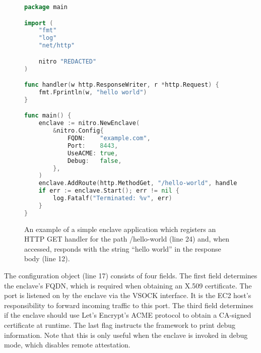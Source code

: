 \begin{figure}[t]
\begin{lstlisting}[language=go]
package main

import (
    "fmt"
    "log"
    "net/http"

    nitro "REDACTED"
)

func handler(w http.ResponseWriter, r *http.Request) {
    fmt.Fprintln(w, "hello world")
}

func main() {
    enclave := nitro.NewEnclave(
        &nitro.Config{
            FQDN:    "example.com",
            Port:    8443,
            UseACME: true,
            Debug:   false,
        },
    )
    enclave.AddRoute(http.MethodGet, "/hello-world", handler)
    if err := enclave.Start(); err != nil {
        log.Fatalf("Terminated: %v", err)
    }
}
\end{lstlisting}
\caption{An example of a simple enclave application which registers an HTTP GET
  handler for the path /hello-world (line 24) and, when accessed, responds with
  the string ``hello world'' in the response body (line 12).}
\label{fig:hello-world}
\end{figure}

The configuration object (line 17) consists of four fields.  The first field
determines the enclave's FQDN, which is required when obtaining an X.509
certificate.  The port is listened on by the enclave via the VSOCK interface.
It is the EC2 host's responsibility to forward incoming traffic to
this port.  The third field determines if the enclave should use Let's Encrypt's
ACME protocol to obtain a CA-signed certificate at runtime.
The last flag instructs the framework to print debug information.  Note that
this is only useful when the enclave is invoked in debug mode, which disables
remote attestation.
